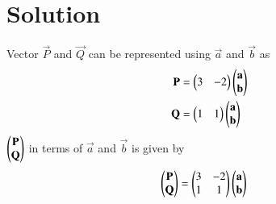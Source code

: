 \documentclass[journal,12pt,twocolumn]{IEEEtran}
\begin{document}
\section{Solution}
Vector $\vec{P}$ and $\vec{Q}$ can be represented using $\vec{a}$ and $\vec{b}$ as
\begin{align}
\mathbf{P} &= \begin{pmatrix}3&-2\end{pmatrix}\begin{pmatrix}\mathbf{a}\\\mathbf{b}\end{pmatrix}\\
\mathbf{Q} &= \begin{pmatrix}1&1\end{pmatrix}\begin{pmatrix}\mathbf{a}\\\mathbf{b}\end{pmatrix}
\end{align}
$\begin{pmatrix}\mathbf{P}\\\mathbf{Q}\end{pmatrix}$ in terms of $\vec{a}$ and $\vec{b}$ is given by
\begin{align}
\begin{pmatrix}\mathbf{P}\\\mathbf{Q}\end{pmatrix} &= \begin{pmatrix}3 & -2\\1 & 1\end{pmatrix}\begin{pmatrix}\mathbf{a} \\ \mathbf{b}\end{pmatrix}
\end{align}
\end{document}

